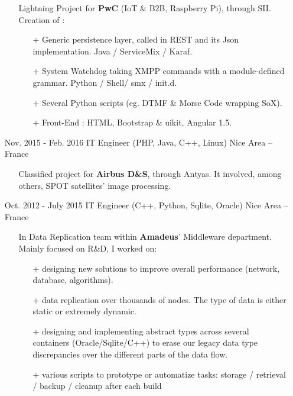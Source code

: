 \documentclass{res}
\begin{document}
\begin{resume}
\begin{itemize}
					\begin{itemize}
						\item[] Lightning Project for \textbf{PwC} (IoT \& B2B, Raspberry Pi), through SII. Creation of :
						\begin{itemize}
							\item[+] Generic persistence layer, called in REST and its Json implementation. Java / ServiceMix / Karaf.
							\item[+] System Watchdog taking XMPP commands with a module-defined grammar. Python / Shell/ smx / init.d.
							\item[+] Several Python scripts (eg. DTMF \& Morse Code wrapping SoX). 
							\item[+] Front-End : HTML, Bootstrap \& uikit, Angular 1.5.
						\end{itemize}
					\end{itemize}
								\item[] Nov. 2015 - Feb. 2016 \tabto{5cm} IT Engineer (PHP, Java, C++, Linux) \hfill Nice Area -- France
												\begin{itemize}
																\item[] Classified project for \textbf{Airbus D\&S}, through Antyas. It involved, among others, SPOT satellites' image processing.
												\end{itemize}
                \item[] Oct. 2012 - July 2015 \tabto{5cm} IT Engineer (C++, Python, Sqlite, Oracle) \hfill Nice Area -- France
                \begin{itemize}
                        \item[] In Data Replication team within \textbf{Amadeus}' Middleware department. Mainly focused on R\&D, I worked on:
                        \begin{itemize}
                                \item[+] designing new solutions to improve overall performance (network, database, algorithms).
                                \item[+] data replication over thousands of nodes. The type of data is either static or extremely dynamic.
                                \item[+] designing and implementing abstract types across several containers (Oracle/Sqlite/C++) to erase our legacy data type discrepancies over the different parts of the data flow.
                                \item[+] various scripts to prototype or automatize tasks: storage / retrieval / backup / cleanup after each build\textellipsis

\end{itemize}
\end{itemize}
\end{itemize}
\end{resume}
\end{document}
